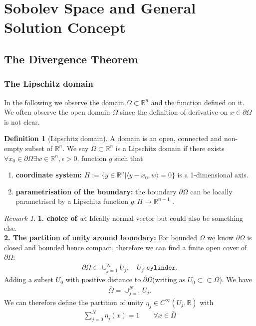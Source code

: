 \documentclass[a4paper,11pt,oneside,fleqn]{book}
\theoremstyle{definition}
\newtheorem{definition}{Definition}[section]
\theoremstyle{remark}
\newtheorem*{remark}{Remark}
\begin{document}
\section{Sobolev Space and General Solution Concept}
\subsection{The Divergence Theorem}
\subsubsection{The Lipschitz domain}
In the following we observe the domain $\Omega \subset \mathbb{R}^n$ and the function defined on it. We often observe the open domain $\Omega$ since the definition of derivative on $x \in \partial \Omega$ is not clear. 
\begin{definition}[Lipschitz domain]
A domain is an open, connected and non-empty subset of $\mathbb{R}^n$. We say $\Omega \subset \mathbb{R}^n$ is a Lipschitz domain if there exists $\forall x_0 \in \partial\Omega \exists w \in \mathbb{R}^n, \epsilon > 0$, function $g$ such that
\begin{enumerate}
	\item \textbf{coordinate system:} $H:= \{ y \in \mathbb{R}^n| \langle y - x_0, w \rangle = 0\}$ is a 1-dimensional axis. 
	\item \textbf{parametrisation of the boundary:} the boundary $\partial\Omega$ can be locally parametrised by a Lipschitz function $g:H \rightarrow \mathbb{R}^{n -1}$ . 
\end{enumerate}
\end{definition}
\begin{remark}
\textbf{1. choice of $w$:} Ideally normal vector but could also be something else. \\
\textbf{2. The partition of unity around boundary:}
 For bounded $\Omega$ we know $\partial \Omega$ is closed and bounded hence compact, therefore we can find a finite open cover of $\partial\Omega$:
\begin{align*}
	\partial\Omega \subset \cup_{j = 1}^N U_j, \quad U_j \texttt{ cylinder}.
\end{align*}	
Adding a subset $U_0$ with positive distance to $\partial\Omega$(writing as $U_0 \subset  \subset \Omega$). We have 
\begin{align*}
	\overline{\Omega} = \cup_{j = 1}^N U_j.
\end{align*}
We can therefore define the partition of unity $\eta_j \in C^\infty(U_j, \mathbb{R})$ with
\begin{align*}
	\sum_{j = 0}^N \eta_j(x) = 1 \qquad \forall x \in \bar{\Omega}
\end{align*}
\end{remark}
\end{document}
